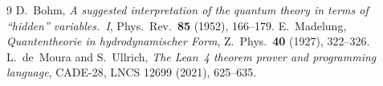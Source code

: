 \documentclass[11pt]{amsart}
\theoremstyle{definition}
\theoremstyle{remark}
\begin{document}
\begin{thebibliography}{9}
 D.~Bohm, \emph{A suggested interpretation of the quantum theory in terms of ``hidden'' variables.~I}, Phys.\ Rev.\ \textbf{85} (1952), 166--179.
 E.~Madelung, \emph{Quantentheorie in hydrodynamischer Form}, Z.\ Phys.\ \textbf{40} (1927), 322--326.
 L.~de~Moura and S.~Ullrich, \emph{The Lean~4 theorem prover and programming language}, CADE-28, LNCS 12699 (2021), 625--635.
\end{thebibliography}
\end{document}
